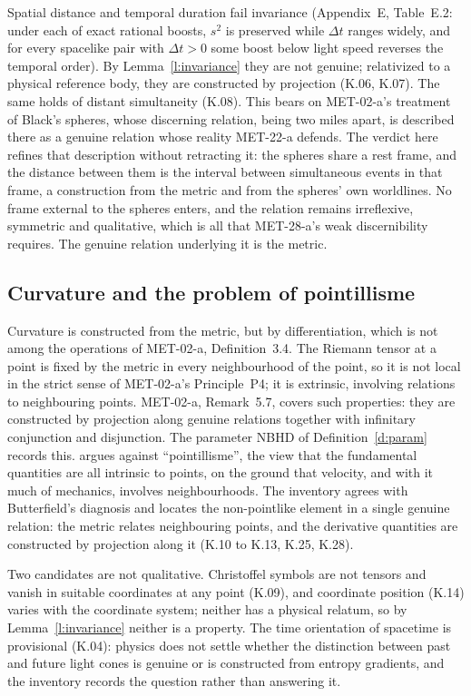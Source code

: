 \documentclass{situationist-preprint}
\begin{document}
Spatial distance and temporal duration fail invariance (Appendix~E, Table~E.2: under each of \vvNEboosts{} exact rational boosts, $s^2$ is preserved while $\Delta t$ ranges widely, and for every spacelike pair with $\Delta t > 0$ some boost below light speed reverses the temporal order). By Lemma~\ref{l:invariance} they are not genuine; relativized to a physical reference body, they are constructed by projection (K.06, K.07). The same holds of distant simultaneity (K.08). This bears on MET-02-a's treatment of Black's spheres, whose discerning relation, being two miles apart, is described there as a genuine relation whose reality MET-22-a defends. The verdict here refines that description without retracting it: the spheres share a rest frame, and the distance between them is the interval between simultaneous events in that frame, a construction from the metric and from the spheres' own worldlines. No frame external to the spheres enters, and the relation remains irreflexive, symmetric and qualitative, which is all that MET-28-a's weak discernibility requires. The genuine relation underlying it is the metric.

\subsection{Curvature and the problem of pointillisme}

Curvature is constructed from the metric, but by differentiation, which is not among the operations of MET-02-a, Definition~3.4. The Riemann tensor at a point is fixed by the metric in every neighbourhood of the point, so it is not local in the strict sense of MET-02-a's Principle~P4; it is extrinsic, involving relations to neighbouring points. MET-02-a, Remark~5.7, covers such properties: they are constructed by projection along genuine relations together with infinitary conjunction and disjunction. The parameter NBHD of Definition~\ref{d:param} records this. \citet{Butterfield2006} argues against \enquote{pointillisme}, the view that the fundamental quantities are all intrinsic to points, on the ground that velocity, and with it much of mechanics, involves neighbourhoods. The inventory agrees with Butterfield's diagnosis and locates the non-pointlike element in a single genuine relation: the metric relates neighbouring points, and the derivative quantities are constructed by projection along it (K.10 to K.13, K.25, K.28).

Two candidates are not qualitative. Christoffel symbols are not tensors and vanish in suitable coordinates at any point (K.09), and coordinate position (K.14) varies with the coordinate system; neither has a physical relatum, so by Lemma~\ref{l:invariance} neither is a property. The time orientation of spacetime is provisional (K.04): physics does not settle whether the distinction between past and future light cones is genuine or is constructed from entropy gradients, and the inventory records the question rather than answering it.
\end{document}
